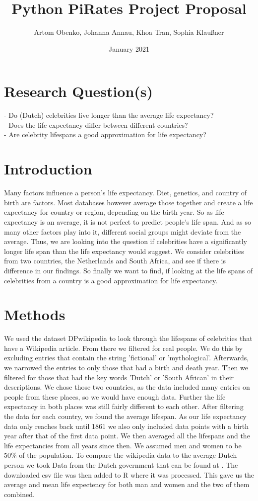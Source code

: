 \documentclass{article}
\title{Python PiRates Project Proposal}
\author{Artom Obenko, Johanna Annau, Khoa Tran, Sophia Klaußner}
\date{January 2021}
\begin{document}
	
\maketitle
	
\section{Research Question(s)}
	- Do (Dutch) celebrities live longer than the average life expectancy?\\
	- Does the life expectancy differ between different countries?\\
	- Are celebrity lifespans a good approximation for life expectancy?\\
	
\section{Introduction}
Many factors influence a person's life expectancy. Diet, genetics, and country of birth are factors. Most databases however average those together and create a life expectancy for country or region, depending on the birth year. %
So as life expectancy is an average, it is not perfect to predict people's life span. And as so many other factors play into it, different social groups might deviate from the average. Thus, we are looking into the question if celebrities have a significantly longer life span than the life expectancy would suggest. We consider celebrities from two countries, the Netherlands and South Africa, and see if there is difference in our findings. So finally we want to find, if looking at the life spans of celebrities from a country is a good approximation for life expectancy.

\section{Methods}
We used the dataset DPwikipedia to look through the lifespans of celebrities that have a Wikipedia article. From there we filtered for real people. We do this by excluding entries that contain the string 'fictional' or 'mythological'. Afterwards, we narrowed the entries to only those that had a birth and death year. Then we filtered for those that had the key words 'Dutch' or 'South African' in their descriptions. We chose those two countries, as the data included many entries on people from these places, so we would have enough data. Further the life expectancy in both places was still fairly different to each other. After filtering the data for each country, we found the average lifespan. As our life expectancy data only reaches back until 1861 we also only included data points with a birth year after that of the first data point. We then averaged all the lifespans and the life expectancies from all years since then. We assumed men and women to be 50\% of the population. To compare the wikipedia data to the average Dutch person we took Data from the Dutch government that can be found at \cite{Levensverwachting}. The downloaded csv file was then added to R where it was processed. This gave us the average and mean life expectency for both man and women and the two of them combined.
 
\end{document}
